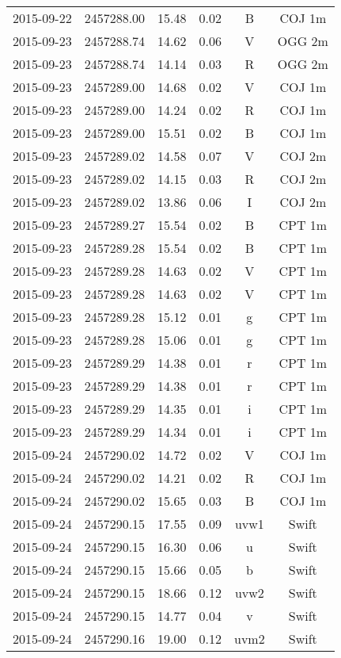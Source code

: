 \begin{table}
\begin{tabular}{cccccc}
2015-09-22 & 2457288.00 & 15.48 & 0.02 & B & COJ 1m \\
2015-09-23 & 2457288.74 & 14.62 & 0.06 & V & OGG 2m \\
2015-09-23 & 2457288.74 & 14.14 & 0.03 & R & OGG 2m \\
2015-09-23 & 2457289.00 & 14.68 & 0.02 & V & COJ 1m \\
2015-09-23 & 2457289.00 & 14.24 & 0.02 & R & COJ 1m \\
2015-09-23 & 2457289.00 & 15.51 & 0.02 & B & COJ 1m \\
2015-09-23 & 2457289.02 & 14.58 & 0.07 & V & COJ 2m \\
2015-09-23 & 2457289.02 & 14.15 & 0.03 & R & COJ 2m \\
2015-09-23 & 2457289.02 & 13.86 & 0.06 & I & COJ 2m \\
2015-09-23 & 2457289.27 & 15.54 & 0.02 & B & CPT 1m \\
2015-09-23 & 2457289.28 & 15.54 & 0.02 & B & CPT 1m \\
2015-09-23 & 2457289.28 & 14.63 & 0.02 & V & CPT 1m \\
2015-09-23 & 2457289.28 & 14.63 & 0.02 & V & CPT 1m \\
2015-09-23 & 2457289.28 & 15.12 & 0.01 & g & CPT 1m \\
2015-09-23 & 2457289.28 & 15.06 & 0.01 & g & CPT 1m \\
2015-09-23 & 2457289.29 & 14.38 & 0.01 & r & CPT 1m \\
2015-09-23 & 2457289.29 & 14.38 & 0.01 & r & CPT 1m \\
2015-09-23 & 2457289.29 & 14.35 & 0.01 & i & CPT 1m \\
2015-09-23 & 2457289.29 & 14.34 & 0.01 & i & CPT 1m \\
2015-09-24 & 2457290.02 & 14.72 & 0.02 & V & COJ 1m \\
2015-09-24 & 2457290.02 & 14.21 & 0.02 & R & COJ 1m \\
2015-09-24 & 2457290.02 & 15.65 & 0.03 & B & COJ 1m \\
2015-09-24 & 2457290.15 & 17.55 & 0.09 & uvw1 & Swift \\
2015-09-24 & 2457290.15 & 16.30 & 0.06 & u & Swift \\
2015-09-24 & 2457290.15 & 15.66 & 0.05 & b & Swift \\
2015-09-24 & 2457290.15 & 18.66 & 0.12 & uvw2 & Swift \\
2015-09-24 & 2457290.15 & 14.77 & 0.04 & v & Swift \\
2015-09-24 & 2457290.16 & 19.00 & 0.12 & uvm2 & Swift \\

\end{tabular}
\end{table}
